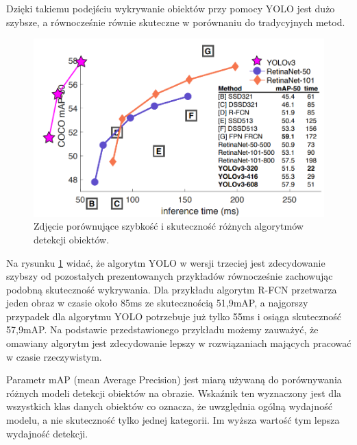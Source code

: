 Dzięki takiemu podejściu wykrywanie obiektów przy pomocy YOLO jest dużo szybsze, a równocześnie równie skuteczne w porównaniu do tradycyjnych metod.

\begin{figure}[H]
	\centering
	\includegraphics[width=14cm]{pages/teoria/zdjecia/wykresDzialaniaYOLO.png}
	\caption{Zdjęcie porównujące szybkość i skuteczność różnych algorytmów detekcji obiektów. \cite{yoloV3ArtAutora}}
	\label{rys:porownanieAutora}
\end{figure}

Na rysunku \ref{rys:porownanieAutora} widać, że algorytm YOLO w wersji trzeciej jest zdecydowanie szybszy od pozostałych prezentowanych przykładów równocześnie zachowując podobną skuteczność wykrywania.
Dla przykładu algorytm R-FCN przetwarza jeden obraz w czasie około 85ms ze skutecznością 51,9mAP, a najgorszy przypadek dla algorytmu YOLO potrzebuje już tylko 55ms i osiąga skuteczność 57,9mAP.
Na podstawie przedstawionego przykładu możemy zauważyć, że omawiany algorytm jest zdecydowanie lepszy w rozwiązaniach mających pracować w czasie rzeczywistym.

Parametr mAP (mean Average Precision) jest miarą używaną do porównywania różnych modeli detekcji obiektów na obrazie. Wskaźnik ten wyznaczony jest dla wszystkich klas danych obiektów co oznacza, 
że uwzględnia ogólną wydajność modelu, a nie skuteczność tylko jednej kategorii. Im wyższa wartość tym lepsza wydajność detekcji.